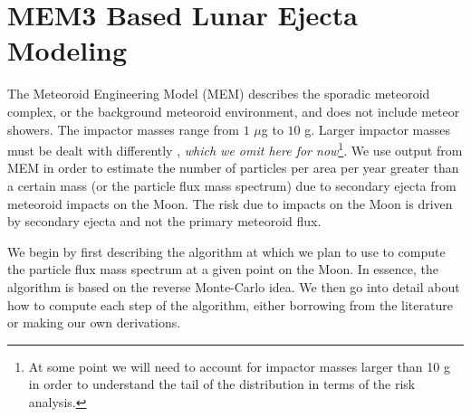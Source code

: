 \documentclass{hitec}
\numberwithin{equation}{section}
\begin{document}
\section{MEM3 Based Lunar Ejecta Modeling}
\label{sec:MEM3 Based Lunar Ejecta Modeling}
The \textsf{Meteoroid Engineering Model} (MEM) describes the sporadic meteoroid complex, or the background meteoroid environment, and does not include meteor showers. The impactor masses range from $1$ $\mu$g to $10$ g. Larger impactor masses must be dealt with differently \citep[e.g., see][]{neukum2001cratering, brown2002flux},\textit{ which we omit here for now}\footnote{At some point we will need to account for impactor masses larger than 10 g in order to understand the tail of the distribution in terms of the risk analysis.}. We use output from MEM in order to estimate the number of particles per area per year greater than a certain mass (or the particle flux mass spectrum) due to secondary ejecta from meteoroid impacts on the Moon. The risk due to impacts on the Moon is driven by secondary ejecta and not the primary meteoroid flux.

We begin by first describing the algorithm at which we plan to use to compute the particle flux mass spectrum at a given point on the Moon. In essence, the algorithm is based on the reverse Monte-Carlo idea. We then go into detail about how to compute each step of the algorithm, either borrowing from the literature or making our own derivations.
\end{document}
